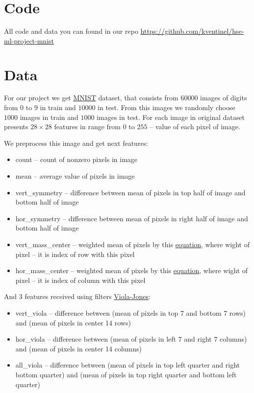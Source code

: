 \section*{Code}

All code and data you can found in our repo \url{https://github.com/kventinel/hse-ml-project-mnist}

\section*{Data}

For our project we get \href{http://yann.lecun.com/exdb/mnist/}{MNIST} dataset, that consists from $60000$ images of digits from $0$ to $9$ in train and $10000$ in test. From this images we randomly choose $1000$ images in train and $1000$ images in test. For each image in original dataset presents $28 \times 28$ features in range from $0$ to $255$ -- value of each pixel of image.

    \begin{center}
    \end{center}


We preprocess this image and get next features:
\begin{itemize}
            \item count -- count of nonzero pixels in image
            \item mean -- average value of pixels in image
            \item vert\_symmetry -- difference between mean of pixels in top half of image and bottom half of image
            \item hor\_symmetry -- difference between mean of pixels in right half of image and bottom half of image
            \item vert\_mass\_center -- weighted mean of pixels by this \href{https://en.wikipedia.org/wiki/Center_of_mass}{equation}, where wight of pixel -- it is index of row with this pixel
            \item hor\_mass\_center -- weighted mean of pixels by this \href{https://en.wikipedia.org/wiki/Center_of_mass}{equation}, where wight of pixel -- it is index of column with this pixel
\end{itemize}
And 3 features received using filters \href{https://en.wikipedia.org/wiki/Viola–Jones_object_detection_framework}{Viola-Jones}:
\begin{itemize}
        \item vert\_viola -- difference between (mean of pixels in top 7 and bottom 7 rows) and (mean of pixels in center 14 rows)
        \item hor\_viola -- difference between (mean of pixels in left 7 and right 7 columns) and (mean of pixels in center 14 columns)
        \item all\_viola -- difference between (mean of pixels in top left quarter and right bottom quarter) and (mean of pixels in top right quarter and bottom left quarter)
\end{itemize}

